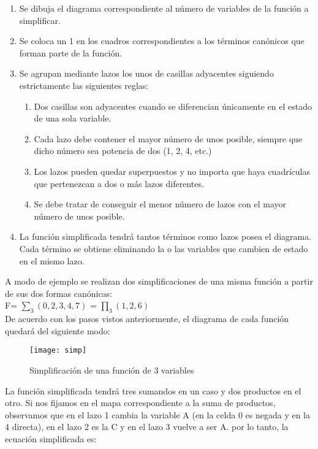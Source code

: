 \documentclass{article}
\begin{document}
                \begin{enumerate}
                    \item Se dibuja el diagrama correspondiente al número de variables de la función a simplificar.
                    \item Se coloca un 1 en los cuadros correspondientes a los términos canónicos que forman parte de la función.
                    \item Se agrupan mediante lazos los unos de casillas adyacentes siguiendo estrictamente las siguientes reglas:
                        \begin{enumerate}
                        \item Dos casillas son adyacentes cuando se diferencian únicamente en el estado de una sola variable.
                        \item Cada lazo debe contener el mayor número de unos posible, siempre que dicho número sea potencia de dos (1, 2, 4, etc.)
                        \item Los lazos pueden quedar superpuestos y no importa que haya cuadrículas que pertenezcan a dos o más lazos diferentes.
                        \item Se debe tratar de conseguir el menor número de lazos con el mayor número de unos posible.
                        \end{enumerate}
                    \item La función simplificada tendrá tantos términos como lazos posea el diagrama. Cada término se obtiene eliminando la o las variables que cambien de estado en el mismo lazo.
                \end{enumerate}
                A modo de ejemplo se realizan dos simplificaciones de una misma función a partir de sus dos formas canónicas:\\
                F= $\sum_3(0,2,3,4,7)$ = $\prod_3(1,2,6)$\\
                De acuerdo con los pasos vistos anteriormente, el diagrama de cada función quedará del siguiente modo:\\
                \begin{figure}[H]
                \centering
                \texttt{[image: simp]}
                \caption{Simplificación de una función de 3 variables}
                \end{figure}
                La función simplificada tendrá tres sumandos en un caso y dos productos en el otro. Si nos fijamos en el mapa correspondiente a la suma de productos, observamos que en el lazo 1 cambia la variable A (en la celda 0 es negada y en la 4 directa), en el lazo 2 es la C y en el lazo 3 vuelve a ser A. por lo tanto, la ecuación simplificada es:\\\\
\end{document}
